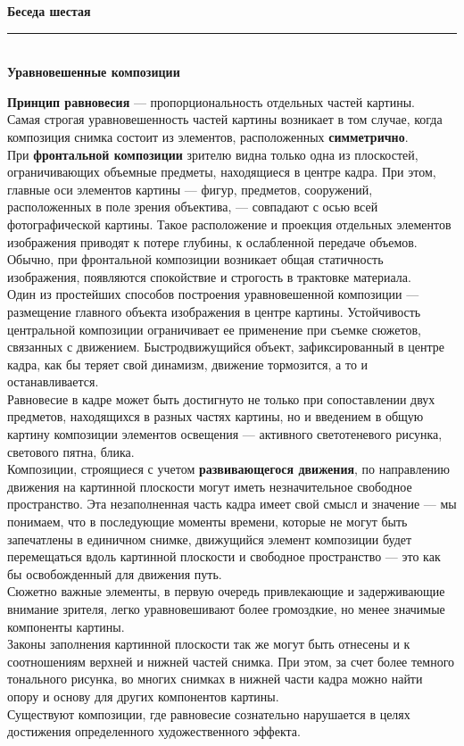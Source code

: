\documentclass{article}
\newcommand{\important}[1]{\textbf{#1}}
\renewcommand{\section}[2]{
	\vspace{6em}
	\begin{flushright}
		\Large
		\baselineskip=0.5\baselineskip
		\textbf{#1}
		\\
		\rule[0.5\baselineskip]{\textwidth}{0.15pt}
		\\
		\textbf{#2}
	\end{flushright}
}
\begin{document}
\section{Беседа шестая}{Уравновешенные композиции}
\important{Принцип равновесия} --- пропорциональность отдельных частей картины.\\
Самая строгая уравновешенность частей картины возникает в том случае, когда композиция снимка состоит из элементов, расположенных \important{симметрично}.\\
При \important{фронтальной композиции} зрителю видна только одна из плоскостей, ограничивающих объемные предметы, находящиеся в центре кадра. При этом, главные оси элементов картины --- фигур, предметов, сооружений, расположенных в поле зрения объектива, --- совпадают с осью всей фотографической картины. Такое расположение и проекция отдельных элементов изображения приводят к потере глубины, к ослабленной передаче объемов. Обычно, при фронтальной композиции возникает общая статичность изображения, появляются спокойствие и строгость в трактовке материала.\\
Один из простейших способов построения уравновешенной композиции --- размещение главного объекта изображения в центре картины. Устойчивость центральной композиции ограничивает ее применение при съемке сюжетов, связанных с движением. Быстродвижущийся объект, зафиксированный в центре кадра, как бы теряет свой динамизм, движение тормозится, а то и останавливается.\\
Равновесие в кадре может быть достигнуто не только при сопоставлении двух предметов, находящихся в разных частях картины, но и введением в общую картину композиции элементов освещения --- активного светотеневого рисунка, светового пятна, блика.\\
Композиции, строящиеся с учетом \important{развивающегося движения}, по направлению движения на картинной плоскости могут иметь незначительное свободное пространство. Эта незаполненная часть кадра имеет свой смысл и значение --- мы понимаем, что в последующие моменты времени, которые не могут быть запечатлены в единичном снимке, движущийся элемент композиции будет перемещаться вдоль картинной плоскости и свободное пространство --- это как бы освобожденный для движения путь.\\ 
Сюжетно важные элементы, в первую очередь привлекающие и задерживающие внимание зрителя, легко уравновешивают более громоздкие, но менее значимые компоненты картины.\\
Законы заполнения картинной плоскости так же могут быть отнесены и к соотношениям верхней и нижней частей снимка. При этом, за счет более темного тонального рисунка, во многих снимках в нижней части кадра можно найти опору и основу для других компонентов картины.\\
Существуют композиции, где равновесие сознательно нарушается в целях достижения определенного художественного эффекта.
\end{document}
